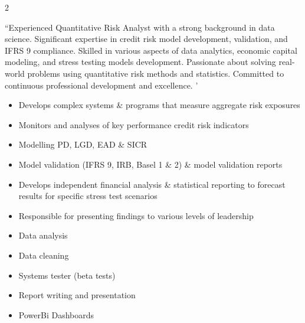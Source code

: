 \documentclass[10pt,a4paper,ragged2e,withhyper]{altacv}
\begin{document}
\begin{paracol}{2}

“Experienced Quantitative Risk Analyst with a strong background in data science. Significant expertise in credit risk model development, validation, and IFRS 9 compliance. Skilled in various aspects of data analytics, economic capital modeling, and stress testing models development. Passionate about solving real-world problems using quantitative risk methods and statistics. Committed to continuous professional development and excellence. '




\begin{itemize}
\item  Develops complex systems \& programs that measure aggregate risk exposures
\item Monitors and analyses of key performance credit risk indicators
\item Modelling PD, LGD, EAD \& SICR
\item Model validation (IFRS 9, IRB, Basel 1 \& 2) \& model validation reports
\item Develops independent financial analysis \& statistical reporting to forecast
results for specific stress test scenarios
\item Responsible for presenting findings to various levels of leadership\\
\end{itemize}

\divider

\begin{itemize}
\item Data analysis
\item Data cleaning
\item Systems tester (beta tests)
\item Report writing and presentation
\item PowerBi Dashboards\\

\end{itemize}


\end{paracol}
\end{document}
